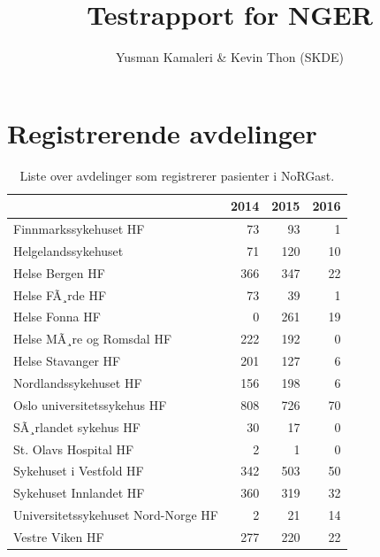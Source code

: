 \documentclass[norsk,a4paper]{article}\usepackage[]{graphicx}\usepackage[]{color}
\title{Testrapport for NGER}
\author{Yusman Kamaleri \& Kevin Thon (SKDE)}
\begin{document}
% 

\addtolength{\hoffset}{-0.5cm}
\addtolength{\textwidth}{1cm}
\addtolength{\voffset}{-1cm}
\addtolength{\textheight}{2cm}

\maketitle

\tableofcontents
\newpage

\listoffigures
\listoftables

\clearpage





\section{Registrerende avdelinger}

\begin{table}[ht]
\centering
\begin{tabular}{lrrr}
  \hline
 & 2014 & 2015 & 2016 \\ 
  \hline
Finnmarkssykehuset HF & 73 & 93 & 1 \\ 
  Helgelandssykehuset & 71 & 120 & 10 \\ 
  Helse Bergen HF & 366 & 347 & 22 \\ 
  Helse FÃ¸rde HF & 73 & 39 & 1 \\ 
  Helse Fonna HF & 0 & 261 & 19 \\ 
  Helse MÃ¸re og Romsdal HF & 222 & 192 & 0 \\ 
  Helse Stavanger HF & 201 & 127 & 6 \\ 
  Nordlandssykehuset HF & 156 & 198 & 6 \\ 
  Oslo universitetssykehus HF & 808 & 726 & 70 \\ 
  SÃ¸rlandet sykehus HF & 30 & 17 & 0 \\ 
  St. Olavs Hospital HF & 2 & 1 & 0 \\ 
  Sykehuset i Vestfold HF & 342 & 503 & 50 \\ 
  Sykehuset Innlandet HF & 360 & 319 & 32 \\ 
  Universitetssykehuset Nord-Norge HF & 2 & 21 & 14 \\ 
  Vestre Viken HF & 277 & 220 & 22 \\ 
   \hline
\end{tabular}
\caption{Liste over avdelinger som registrerer pasienter i NoRGast.} 
\label{tab:RegistrenrendeAvd}
\end{table}
\end{document}
